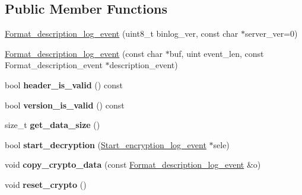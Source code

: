 \subsection*{Public Member Functions}
\begin{DoxyCompactItemize}
\item 
\mbox{\hyperlink{classFormat__description__log__event_a16479166b988fa107634b4626bc38c29}{Format\+\_\+description\+\_\+log\+\_\+event}} (uint8\+\_\+t binlog\+\_\+ver, const char $\ast$server\+\_\+ver=0)
\item 
\mbox{\hyperlink{classFormat__description__log__event_a0f616fc36bc7f1f9574195799b1a9db7}{Format\+\_\+description\+\_\+log\+\_\+event}} (const char $\ast$buf, uint event\+\_\+len, const Format\+\_\+description\+\_\+event $\ast$description\+\_\+event)
\item 
\mbox{\label{classFormat__description__log__event_add35992074f191ad40c4a967a898d714}} 
bool {\bfseries header\+\_\+is\+\_\+valid} () const
\item 
\mbox{\label{classFormat__description__log__event_a88b8245fe5ad3deb1307aadb98c242ce}} 
bool {\bfseries version\+\_\+is\+\_\+valid} () const
\item 
\mbox{\label{classFormat__description__log__event_afab29fcff746d8ce8f48dc6e8f301074}} 
size\+\_\+t {\bfseries get\+\_\+data\+\_\+size} ()
\item 
\mbox{\label{classFormat__description__log__event_a259f9a11c16551453647d9b3c37bc7b7}} 
bool {\bfseries start\+\_\+decryption} (\mbox{\hyperlink{classStart__encryption__log__event}{Start\+\_\+encryption\+\_\+log\+\_\+event}} $\ast$sele)
\item 
\mbox{\label{classFormat__description__log__event_ab0c064b50da09ffd9cabbbc3cfaa390a}} 
void {\bfseries copy\+\_\+crypto\+\_\+data} (const \mbox{\hyperlink{classFormat__description__log__event}{Format\+\_\+description\+\_\+log\+\_\+event}} \&o)
\item 
\mbox{\label{classFormat__description__log__event_a78fef3c9619d3904b8137f95798fc969}} 
void {\bfseries reset\+\_\+crypto} ()
\end{DoxyCompactItemize}
